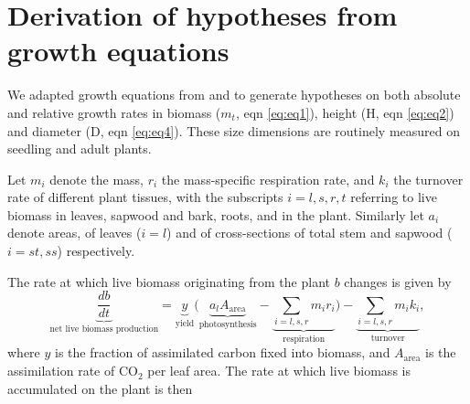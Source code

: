 \documentclass[a4paper]{article}\usepackage[]{graphicx}\usepackage[]{color}
\begin{document}
\newpage

\begin{Appendix} \label{sec:textbox}

\renewcommand{\thefigure}{A\arabic{figure}}
\renewcommand{\thetable}{A\arabic{table}}

\setcounter{figure}{0}
\setcounter{table}{0}

\section{Derivation of hypotheses from growth equations}\label{app:growth} 

We adapted growth equations from \cite{Falster:2011ii} and \cite{falster:2013} to generate hypotheses on both absolute and relative growth rates in biomass ($m_t$, eqn \ref{eq:eq1}), height (H, eqn \ref{eq:eq2}) and diameter (D, eqn \ref{eq:eq4}). These size dimensions are routinely measured on seedling and adult plants. 

Let $m_i$ denote the mass, $r_i$ the mass-specific respiration rate, and $k_i$ the turnover rate of different plant tissues, with the subscripts $i=l,s,r,t$ referring to live biomass in leaves, sapwood and bark, roots, and in the plant. Similarly let $a_i$ denote areas, of leaves ($i=l$) and of cross-sections of total stem and sapwood ($i= st,ss$) respectively.

The rate at which live biomass originating from the plant $b$ changes is given by
\begin{equation}\label{eq:eq0}
\underbrace{\frac{db}{dt}}_{\text{net live biomass production}} = \underbrace{y}_{\text{yield}}  \big(\underbrace{a_{l} A_{\textrm{area}}}_{\text{photosynthesis}} - \underbrace{\sum_{i=l,s,r} m_{i} r_{i}}_{\text{respiration}}\big) - \underbrace{ \sum_{i=l,s,r} m_{i} k_{i}}_{\text{turnover}},
\end{equation}
where $y$ is the fraction of assimilated carbon fixed into biomass,  and  $A_{\textrm{area}}$ is the assimilation rate of CO$_{2}$ per leaf area. The rate at which live biomass is accumulated on the plant is then 


\end{Appendix}
\end{document}

